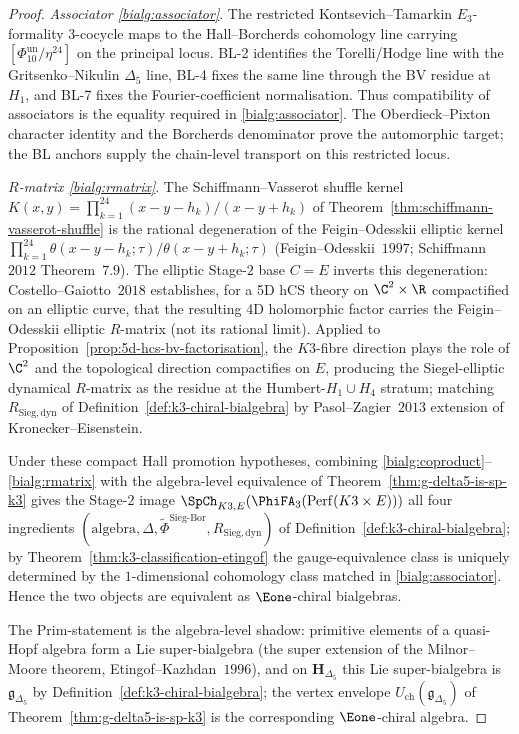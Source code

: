 \begin{proof}
\emph{Associator \textup{\ref{bialg:associator}}}.
The restricted Kontsevich--Tamarkin $E_3$-formality $3$-cocycle maps to
the Hall--Borcherds cohomology line carrying $[\Phi_{10}^{\mathrm{un}}/\eta^{24}]$ on
the principal locus. BL-2 identifies the Torelli/Hodge line with the
Gritsenko--Nikulin $\Delta_5$ line, BL-4 fixes the same line through the
BV residue at $H_1$, and BL-7 fixes the Fourier-coefficient
normalisation. Thus compatibility of associators is the equality
required in \ref{bialg:associator}. The Oberdieck--Pixton character
identity and the Borcherds denominator prove the automorphic target; the
BL anchors supply the chain-level transport on this restricted locus.

\emph{$R$-matrix \textup{\ref{bialg:rmatrix}}}.
The Schiffmann--Vasserot shuffle kernel $K(x,y) = \prod_{k=1}^{24}(x-y-h_k)/(x-y+h_k)$ of Theorem~\ref{thm:schiffmann-vasserot-shuffle} is the rational degeneration of the Feigin--Odesskii elliptic kernel $\prod_{k=1}^{24}\theta(x-y-h_k;\tau)/\theta(x-y+h_k;\tau)$ (Feigin--Odesskii~$1997$; Schiffmann~$2012$ Theorem~$7.9$). The elliptic Stage-$2$ base $C = E$ inverts this degeneration: Costello--Gaiotto~$2018$ \cite{CostelloGaiotto2018} establishes, for a 5D hCS theory on $\C^2 \times \R$ compactified on an elliptic curve, that the resulting 4D holomorphic factor carries the Feigin--Odesskii elliptic $R$-matrix (not its rational limit). Applied to Proposition~\ref{prop:5d-hcs-bv-factorisation}, the $K3$-fibre direction plays the role of $\C^2$ and the topological direction compactifies on $E$, producing the Siegel-elliptic dynamical $R$-matrix as the residue at the Humbert-$H_1 \cup H_4$ stratum; matching $R_{\mathrm{Sieg,dyn}}$ of Definition~\ref{def:k3-chiral-bialgebra} by Pasol--Zagier~$2013$ extension of Kronecker--Eisenstein.

Under these compact Hall promotion hypotheses, combining \ref{bialg:coproduct}--\ref{bialg:rmatrix} with the algebra-level equivalence of Theorem~\ref{thm:g-delta5-is-sp-k3} gives the Stage-$2$ image $\SpCh_{K3, E}(\PhiFA_3(\mathrm{Perf}(K3 \times E)))$ all four ingredients $(\text{algebra}, \Delta, \widetilde{\Phi}^{\mathrm{Sieg\text{-}Bor}}, R_{\mathrm{Sieg,dyn}})$ of Definition~\ref{def:k3-chiral-bialgebra}; by Theorem~\ref{thm:k3-classification-etingof} the gauge-equivalence class is uniquely determined by the $1$-dimensional cohomology class matched in \ref{bialg:associator}. Hence the two objects are equivalent as $\Eone$-chiral bialgebras.

The $\mathrm{Prim}$-statement is the algebra-level shadow: primitive elements of a quasi-Hopf algebra form a Lie super-bialgebra (the super extension of the Milnor--Moore theorem, Etingof--Kazhdan~$1996$), and on $\mathbf{H}_{\Delta_5}$ this Lie super-bialgebra is $\mathfrak{g}_{\Delta_5}$ by Definition~\ref{def:k3-chiral-bialgebra}; the vertex envelope $U_{\mathrm{ch}}(\mathfrak{g}_{\Delta_5})$ of Theorem~\ref{thm:g-delta5-is-sp-k3} is the corresponding $\Eone$-chiral algebra.
\end{proof}

